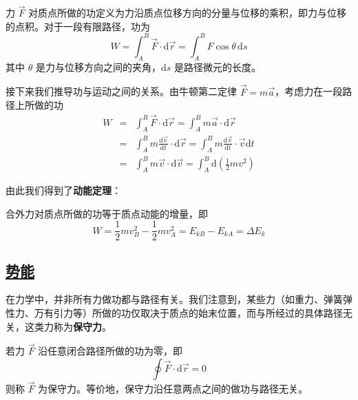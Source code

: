 \begin{definition}[功]
    力 $\vec{F}$ 对质点所做的功定义为力沿质点位移方向的分量与位移的乘积，即力与位移的点积。对于一段有限路径，功为
    \begin{equation}
        W = \int_{A}^{B} \vec{F} \cdot \mathrm{d}\vec{r} = \int_{A}^{B} F\cos\theta \, \mathrm{d}s
    \end{equation}
    其中 $\theta$ 是力与位移方向之间的夹角，$\mathrm{d}s$ 是路径微元的长度。
\end{definition}

接下来我们推导功与运动之间的关系。由牛顿第二定律 $\vec{F} = m\vec{a}$，考虑力在一段路径上所做的功
\begin{eqnarray*}
    W &=& \int_{A}^{B} \vec{F} \cdot \mathrm{d}\vec{r} = \int_{A}^{B} m\vec{a} \cdot \mathrm{d}\vec{r} \\
    &=& \int_{A}^{B} m\frac{\mathrm{d}\vec{v}}{\mathrm{d}t} \cdot \mathrm{d}\vec{r} = \int_{A}^{B} m\frac{\mathrm{d}\vec{v}}{\mathrm{d}t} \cdot \vec{v}\mathrm{d}t \\
    &=& \int_{A}^{B} m\vec{v} \cdot \mathrm{d}\vec{v} = \int_{A}^{B} \mathrm{d}\left(\frac{1}{2}mv^2\right)
\end{eqnarray*}

由此我们得到了\textbf{动能定理}：
\begin{theorem}[动能定理]
    合外力对质点所做的功等于质点动能的增量，即
    \begin{equation}
        W = \frac{1}{2}mv_B^2 - \frac{1}{2}mv_A^2 = E_{kB} - E_{kA} = \Delta E_k
    \end{equation}
\end{theorem}

\subsection{\protect\hyperlink{:}{势能}}

在力学中，并非所有力做功都与路径有关。我们注意到，某些力（如重力、弹簧弹性力、万有引力等）所做的功仅取决于质点的始末位置，而与所经过的具体路径无关，这类力称为\textbf{保守力}。

\begin{definition}[保守力]
    若力 $\vec{F}$ 沿任意闭合路径所做的功为零，即
    \begin{equation}
        \oint \vec{F} \cdot \mathrm{d}\vec{r} = 0
    \end{equation}
    则称 $\vec{F}$ 为保守力。等价地，保守力沿任意两点之间的做功与路径无关。
\end{definition}

